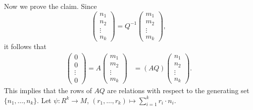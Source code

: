 Now we prove the claim. Since 
\[
\begin{pmatrix}
n_1\\
n_2\\
\vdots\\
n_k	
\end{pmatrix}
=Q^{-1}\begin{pmatrix}
m_1\\
m_2\\
\vdots\\
m_k
\end{pmatrix},
\]
it follows that 
\begin{align*} 
\begin{pmatrix}
0\\
0\\
\vdots\\
0	
\end{pmatrix}
=A\begin{pmatrix}
m_1\\
m_2\\
\vdots\\
m_k	
\end{pmatrix}
&=
(AQ)\begin{pmatrix}
	n_1\\
	n_2\\
	\vdots\\
	n_k
\end{pmatrix}.
\end{align*}
This implies that the rows of $AQ$ are relations with respect to the generating set 
$\{n_1,\dots,n_k\}$. 
Let $\psi\colon R^k\to M$, $(r_1,\dots,r_k)\mapsto \sum_{i=1}^k r_i\cdot n_i$.

